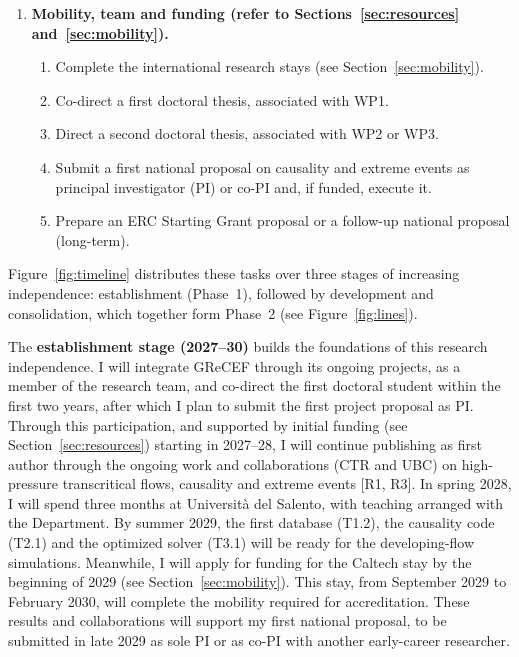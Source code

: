 \documentclass[11pt]{article}
\begin{document}
\begin{enumerate}[label=\textbf{WP\arabic*}, leftmargin=*]
\begin{enumerate}[label=T3.\arabic*, leftmargin=*, nosep]
  \end{enumerate}
  \item \textbf{Mobility, team and funding (refer to Sections~\ref{sec:resources} and~\ref{sec:mobility}).}
  \begin{enumerate}[label=T4.\arabic*, leftmargin=*, nosep]
    \item Complete the international research stays (see Section~\ref{sec:mobility}).
    \item Co-direct a first doctoral thesis, associated with WP1.
    \item Direct a second doctoral thesis, associated with WP2 or WP3.
    \item Submit a first national proposal on causality and extreme events as principal investigator (PI) or co-PI and, if funded, execute it.
    \item Prepare an ERC Starting Grant proposal or a follow-up national proposal (long-term).
  \end{enumerate}
\end{enumerate}

Figure~\ref{fig:timeline} distributes these tasks over three stages of increasing independence: establishment (Phase~1), followed by development and consolidation, which together form Phase~2 (see Figure~\ref{fig:lines}).

The \textbf{establishment stage (2027--30)} builds the foundations of this research independence. 
I will integrate GReCEF through its ongoing projects, as a member of the research team, and co-direct the first doctoral student within the first two years, after which I plan to submit the first project proposal as PI. 
Through this participation, and supported by initial funding (see Section~\ref{sec:resources}) starting in 2027--28, I will continue publishing as first author through the ongoing work and collaborations (CTR and UBC) on high-pressure transcritical flows, causality and extreme events [R1, R3]. 
In spring 2028, I will spend three months at Universit\`a del Salento, with teaching arranged with the Department. 
By summer 2029, the first database (T1.2), the causality code (T2.1) and the optimized solver (T3.1) will be ready for the developing-flow simulations. 
Meanwhile, I will apply for funding for the Caltech stay by the beginning of 2029 (see Section~\ref{sec:mobility}). 
This stay, from September 2029 to February 2030, will complete the mobility required for accreditation. 
These results and collaborations will support my first national proposal, to be submitted in late 2029 as sole PI or as co-PI with another early-career researcher.
\end{document}
